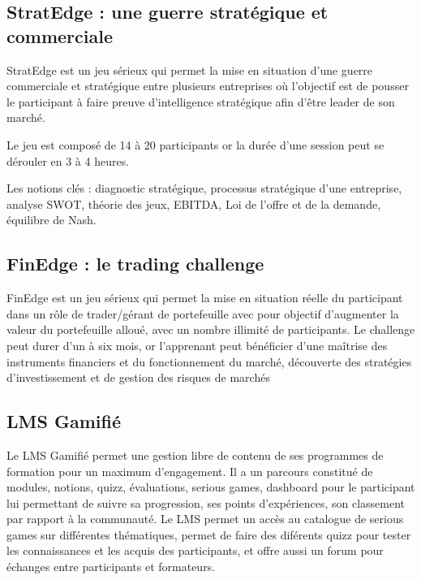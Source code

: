 \subsection{StratEdge : une guerre stratégique et commerciale}

StratEdge est un jeu sérieux qui permet la mise en situation d’une guerre commerciale et
stratégique entre plusieurs entreprises où l’objectif est de pousser le participant à faire preuve
d’intelligence stratégique afin d'être leader de son marché.

Le jeu est composé de 14 à 20 participants or la durée d'une session peut se dérouler en 3
à 4 heures.

Les notions clés : diagnostic stratégique, processus stratégique d’une entreprise,
analyse SWOT, théorie des jeux, EBITDA, Loi de l’offre et de la demande, équilibre de
Nash.

\subsection{FinEdge : le trading challenge}

FinEdge est un jeu sérieux qui permet la mise en situation réelle du participant dans
un rôle de trader/gérant de portefeuille avec pour objectif d’augmenter la valeur du
portefeuille alloué, avec un nombre illimité de participants.
Le challenge peut durer d’un à six mois, or l’apprenant peut bénéficier d’une
maîtrise des instruments financiers et du fonctionnement du marché, découverte des
stratégies d'investissement et de gestion des risques de marchés

\subsection{LMS Gamifié}

Le LMS Gamifié permet une gestion libre de contenu de ses programmes de
formation pour un maximum d’engagement. Il a un parcours constitué de modules,
notions, quizz, évaluations, serious games, dashboard pour le participant lui permettant
de suivre sa progression, ses points d’expériences, son classement par rapport à la
communauté. Le LMS permet un accès au catalogue de serious games sur différentes
thématiques, permet de faire des diférents quizz pour tester les connaissances et les
acquis des participants, et offre aussi un forum pour échanges entre participants et
formateurs.





